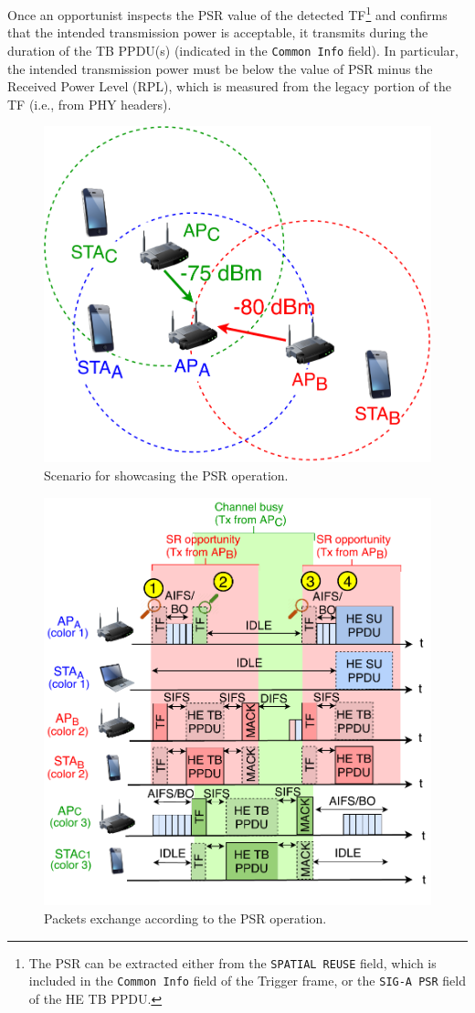 \documentclass{ieeeaccess}
\begin{document}
Once an opportunist inspects the PSR value of the detected TF\footnote{The PSR can be extracted either from the \texttt{SPATIAL REUSE} field, which is included in the \texttt{Common Info} field of the Trigger frame, or the \texttt{SIG-A PSR} field of the HE TB PPDU.} and confirms that the intended transmission power is acceptable, it transmits during the duration of the TB PPDU(s) (indicated in the \texttt{Common Info} field). In particular, the intended transmission power must be below the value of PSR minus the Received Power Level (RPL), which is measured from the legacy portion of the TF (i.e., from PHY headers).

\begin{figure}[ht!]
	\centering
	\includegraphics[width=0.6\columnwidth]{fig_13a}
	\caption{Scenario for showcasing the PSR operation.}
	\label{fig:fig_13a}
\end{figure}

\begin{figure}[ht!]
	\centering
	\includegraphics[width=.9\columnwidth]{fig_13b}
	\caption{Packets exchange according to the PSR operation.}
	\label{fig:fig_13b}
\end{figure}
\end{document}
